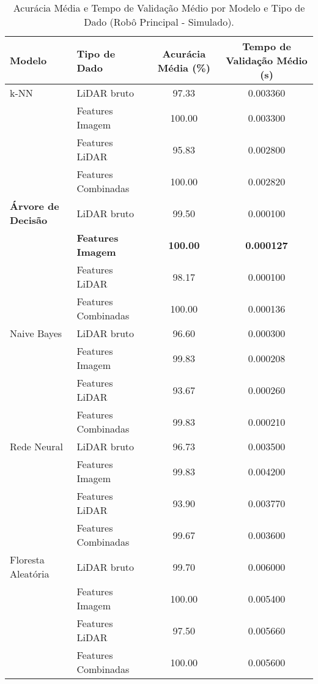 \begin{table}[!ht]
\caption{Acurácia Média e Tempo de Validação Médio por Modelo e Tipo de Dado (Robô Principal - Simulado).}
\centering
\begin{tabular}{llcc}
\hline
\textbf{Modelo} & \textbf{Tipo de Dado} & \textbf{Acurácia Média (\%)} & \textbf{Tempo de Validação Médio (s)} \\
\hline
k-NN                     & LiDAR bruto & 97.33 & 0.003360 \\
                         & Features Imagem & 100.00 & 0.003300 \\
                         & Features LiDAR & 95.83 & 0.002800 \\
                         & Features Combinadas & 100.00 & 0.002820 \\
\hline
\textbf{Árvore de Decisão}        & LiDAR bruto & 99.50 & 0.000100 \\
                         & \textbf{Features Imagem} & \textbf{100.00} & \textbf{0.000127} \\
                         & Features LiDAR & 98.17 & 0.000100 \\
                         & Features Combinadas & 100.00 & 0.000136 \\
\hline
Naive Bayes              & LiDAR bruto & 96.60 & 0.000300 \\
                         & Features Imagem & 99.83 & 0.000208 \\
                         & Features LiDAR & 93.67 & 0.000260 \\
                         & Features Combinadas & 99.83 & 0.000210 \\
\hline
Rede Neural              & LiDAR bruto & 96.73 & 0.003500 \\
                         & Features Imagem & 99.83 & 0.004200 \\
                         & Features LiDAR & 93.90 & 0.003770 \\
                         & Features Combinadas & 99.67 & 0.003600 \\
\hline
Floresta Aleatória       & LiDAR bruto & 99.70 & 0.006000 \\
                         & Features Imagem & 100.00 & 0.005400 \\
                         & Features LiDAR & 97.50 & 0.005660 \\
                         & Features Combinadas & 100.00 & 0.005600 \\
\hline
\end{tabular}
\label{tab:resumo_principal_simulado_tipodado}
\end{table}


